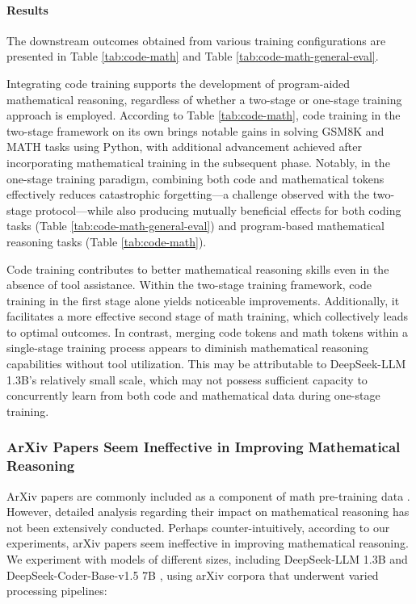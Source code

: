 \begin{itemize}[topsep=0pt]
\paragraph{Results}
The downstream outcomes obtained from various training configurations are presented in Table \ref{tab:code-math} and Table \ref{tab:code-math-general-eval}.

Integrating code training supports the development of program-aided mathematical reasoning, regardless of whether a two-stage or one-stage training approach is employed. According to Table \ref{tab:code-math}, code training in the two-stage framework on its own brings notable gains in solving GSM8K and MATH tasks using Python, with additional advancement achieved after incorporating mathematical training in the subsequent phase. Notably, in the one-stage training paradigm, combining both code and mathematical tokens effectively reduces catastrophic forgetting—a challenge observed with the two-stage protocol—while also producing mutually beneficial effects for both coding tasks (Table \ref{tab:code-math-general-eval}) and program-based mathematical reasoning tasks (Table \ref{tab:code-math}).

Code training contributes to better mathematical reasoning skills even in the absence of tool assistance. Within the two-stage training framework, code training in the first stage alone yields noticeable improvements. Additionally, it facilitates a more effective second stage of math training, which collectively leads to optimal outcomes. In contrast, merging code tokens and math tokens within a single-stage training process appears to diminish mathematical reasoning capabilities without tool utilization. This may be attributable to DeepSeek-LLM 1.3B’s relatively small scale, which may not possess sufficient capacity to concurrently learn from both code and mathematical data during one-stage training.

\subsubsection{ArXiv Papers Seem Ineffective in Improving Mathematical Reasoning}

ArXiv papers are commonly included as a component of math pre-training data \citep{minerva,gpt-f,llemma,mathpile}. However, detailed analysis regarding their impact on mathematical reasoning has not been extensively conducted. Perhaps counter-intuitively, according to our experiments, arXiv papers seem ineffective in improving mathematical reasoning. We experiment with models of different sizes, including DeepSeek-LLM 1.3B and DeepSeek-Coder-Base-v1.5 7B \citep{deepseek-coder}, using arXiv corpora that underwent varied processing pipelines:


\end{itemize}
